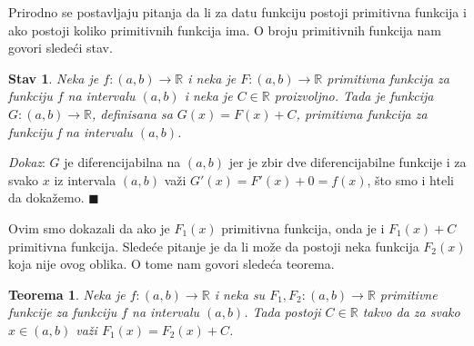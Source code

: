 \documentclass{article}
\newtheorem{teorema}{Teorema}[section]
\newtheorem{stav}{Stav}[section]
\begin{document}
Prirodno se postavljaju pitanja da li za datu funkciju postoji
primitivna funkcija i ako postoji koliko primitivnih funkcija ima.
O broju primitivnih funkcija nam govori sledeći stav.

\begin{stavbox}
    \label{stav_1.1}
    \begin{stav}
        Neka je $f: \left(a, b\right) \longrightarrow \mathbb{R}$
        i neka je $F: \left(a,b\right) \longrightarrow \mathbb{R}$
        primitivna funkcija za funkciju $f$ na intervalu $\left(a, b\right)$
        i neka je $C \in \mathbb{R}$ proizvoljno. Tada je
        funkcija $G: \left(a, b\right) \longrightarrow \mathbb{R}$,
        definisana sa $G\left(x\right) = F\left(x\right) + C$, primitivna funkcija za
        funkciju f na intervalu $\left(a, b\right)$.
    \end{stav}
\end{stavbox}

\textit{Dokaz}: $G$ je diferencijabilna na $\left(a, b\right)$ jer je zbir dve
diferencijabilne funkcije i za svako $x$ iz intervala $\left(a, b\right)$ važi $G'\left(x\right) = F'\left(x\right) + 0 = f\left(x\right)$,
što smo i hteli da dokažemo.
\null\hfill $\blacksquare$\par

Ovim smo dokazali da ako je $F_1\left(x\right)$ primitivna funkcija, onda
je i $F_1\left(x\right)+C$ primitivna funkcija. Sledeće pitanje je da li
može da postoji neka funkcija $F_2\left(x\right)$ koja nije ovog oblika.
O tome nam govori sledeća teorema.

\begin{teoremabox}
    \label{teorema_1.1}
    \begin{teorema}
        Neka je $f: \left(a, b\right) \longrightarrow \mathbb{R}$ i
        neka su $F_1, F_2: \left(a,b\right) \longrightarrow \mathbb{R}$
        primitivne funkcije za funkciju $f$ na intervalu $\left(a, b\right)$.
        Tada postoji $C \in \mathbb{R}$ takvo da
        za svako $x\in\left(a, b\right)$ važi $F_1\left(x\right) = F_2\left(x\right) + C$.
    \end{teorema}
\end{teoremabox}
\end{document}
